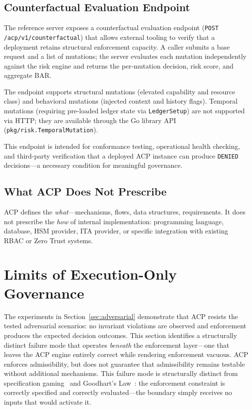 \documentclass[11pt]{article}
\theoremstyle{definition}
\begin{document}
\subsection{Counterfactual Evaluation Endpoint}

The reference server exposes a counterfactual evaluation endpoint
(\texttt{POST /acp/v1/counterfactual}) that allows external tooling to verify
that a deployment retains structural enforcement capacity.
A caller submits a base request and a list of mutations; the server evaluates
each mutation independently against the risk engine and returns the per-mutation
decision, risk score, and aggregate BAR.

The endpoint supports structural mutations (elevated capability and resource class)
and behavioral mutations (injected context and history flags).
Temporal mutations (requiring pre-loaded ledger state via \texttt{LedgerSetup})
are not supported via HTTP; they are available through the Go library API
(\texttt{pkg/risk.TemporalMutation}).

This endpoint is intended for conformance testing, operational health checking,
and third-party verification that a deployed ACP instance can produce
\texttt{DENIED} decisions---a necessary condition for meaningful governance.

\subsection{What ACP Does Not Prescribe}

ACP defines the \emph{what}---mechanisms, flows, data structures, requirements.
It does not prescribe the \emph{how} of internal implementation:
programming language, database, HSM provider, ITA provider,
or specific integration with existing RBAC or Zero Trust systems.

\section{Limits of Execution-Only Governance}
\label{sec:deviation-collapse}

The experiments in Section~\ref{sec:adversarial} demonstrate that ACP
resists the tested adversarial scenarios: no invariant violations are observed and
enforcement produces the expected decision outcomes.
This section identifies a structurally distinct failure mode that operates
\emph{beneath} the enforcement layer---one that leaves the ACP engine entirely
correct while rendering enforcement vacuous.
ACP enforces admissibility, but does not guarantee that admissibility remains
testable without additional mechanisms.
This failure mode is structurally distinct from specification
gaming~\cite{krakovna2020specification} and Goodhart's
Law~\cite{goodhart1975monetary,strathern1997improving}: the enforcement
constraint is correctly specified and correctly evaluated---the boundary simply
receives no inputs that would activate it.
\end{document}
